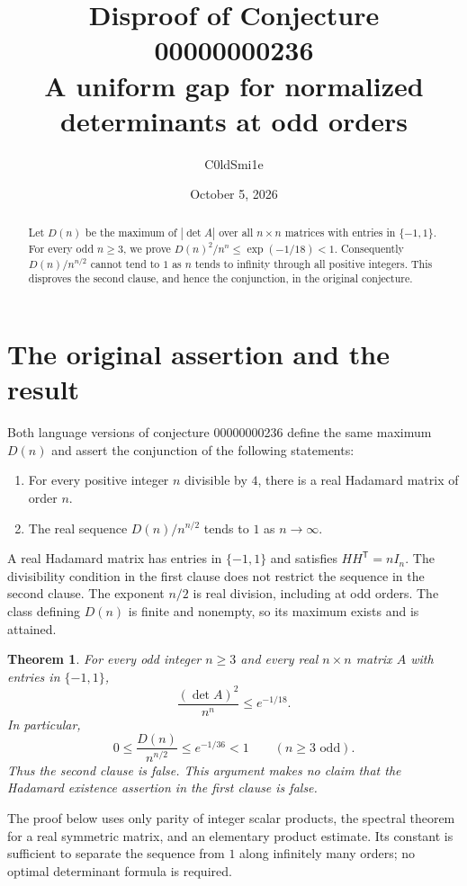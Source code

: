 \documentclass[11pt]{article}
\title{Disproof of Conjecture 00000000236\\[3pt]
\large A uniform gap for normalized determinants at odd orders}
\author{C0ldSmi1e}
\date{October 5, 2026}
\newtheorem{theorem}{Theorem}
\begin{document}
\maketitle

\begin{abstract}
Let $D(n)$ be the maximum of $|\det A|$ over all $n\times n$ matrices
with entries in $\{-1,1\}$. For every odd $n\geq 3$, we prove
$D(n)^2/n^n\leq \exp(-1/18)<1$.
Consequently $D(n)/n^{n/2}$ cannot tend to $1$ as $n$ tends to infinity
through all positive integers. This disproves the second clause, and hence
the conjunction, in the original conjecture.
\end{abstract}

\section{The original assertion and the result}

Both language versions of conjecture 00000000236 define the same maximum
$D(n)$ and assert the conjunction of the following statements:
\begin{enumerate}
\item For every positive integer $n$ divisible by $4$, there is a real
Hadamard matrix of order $n$.
\item The real sequence $D(n)/n^{n/2}$ tends to $1$ as $n\to\infty$.
\end{enumerate}
A real Hadamard matrix has entries in $\{-1,1\}$ and satisfies
$HH^{\mathsf T}=nI_n$. The divisibility condition in the first clause
does not restrict the sequence in the second clause. The exponent $n/2$
is real division, including at odd orders. The class defining $D(n)$ is
finite and nonempty, so its maximum exists and is attained.

\begin{theorem}\label{thm:gap}
For every odd integer $n\geq 3$ and every real $n\times n$ matrix $A$
with entries in $\{-1,1\}$,
\[
 \frac{(\det A)^2}{n^n}\leq e^{-1/18}.
\]
In particular,
\[
 0\leq \frac{D(n)}{n^{n/2}}\leq e^{-1/36}<1
 \qquad(n\geq3\text{ odd}).
\]
Thus the second clause is false. This argument makes no claim that the
Hadamard existence assertion in the first clause is false.
\end{theorem}

The proof below uses only parity of integer scalar products, the spectral
theorem for a real symmetric matrix, and an elementary product estimate.
Its constant is sufficient to separate the sequence from $1$ along
infinitely many orders; no optimal determinant formula is required.
\end{document}

